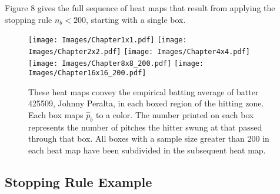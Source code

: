 Figure 8 gives the full sequence of heat maps that result from applying the stopping rule $n_{b} < 200$, starting with a single box.
        \begin{figure}[H]
      	\centering
      	\texttt{[image: Images/Chapter1x1.pdf]}
      	\texttt{[image: Images/Chapter2x2.pdf]}
      	\texttt{[image: Images/Chapter4x4.pdf]}
      	\texttt{[image: Images/Chapter8x8\_200.pdf]} 
      	\texttt{[image: Images/Chapter16x16\_200.pdf]} 
      	\caption{These heat maps convey the empirical batting average of batter 425509, Johnny Peralta, in each boxed region of the hitting zone. Each box maps $\hat{p}_{b}$ to a color. The number printed on each box represents the number of pitches the hitter swung at that passed through that box. All boxes with a sample size greater than 200 in each heat map have been subdivided in the subsequent heat map.}
      	\end{figure}
      	
\subsection{Stopping Rule Example} %
      	
